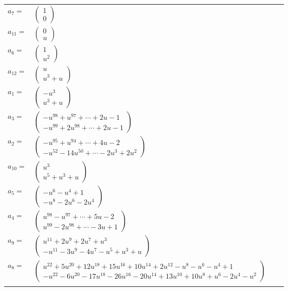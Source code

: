 \documentclass[1p]{elsarticle_modified}
\theoremstyle{definition}
\begin{document}
\begin{tabular}{m{7pt} m{180pt} m{7pt} m{180pt} }
\flushright $a_{7}=$&$\begin{pmatrix}1\\0\end{pmatrix}$ \\
\flushright $a_{11}=$&$\begin{pmatrix}0\\u\end{pmatrix}$ \\
\flushright $a_{6}=$&$\begin{pmatrix}1\\u^2\end{pmatrix}$ \\
\flushright $a_{12}=$&$\begin{pmatrix}u\\u^3+u\end{pmatrix}$ \\
\flushright $a_{1}=$&$\begin{pmatrix}- u^3\\u^3+u\end{pmatrix}$ \\
\flushright $a_{3}=$&$\begin{pmatrix}- u^{98}+u^{97}+\cdots+2 u-1\\- u^{99}+2 u^{98}+\cdots+2 u-1\end{pmatrix}$ \\
\flushright $a_{2}=$&$\begin{pmatrix}- u^{95}+u^{94}+\cdots+4 u-2\\- u^{52}-14 u^{50}+\cdots-2 u^3+2 u^2\end{pmatrix}$ \\
\flushright $a_{10}=$&$\begin{pmatrix}u^3\\u^5+u^3+u\end{pmatrix}$ \\
\flushright $a_{5}=$&$\begin{pmatrix}- u^6- u^4+1\\- u^8-2 u^6-2 u^4\end{pmatrix}$ \\
\flushright $a_{4}=$&$\begin{pmatrix}u^{98}- u^{97}+\cdots+5 u-2\\u^{99}-2 u^{98}+\cdots-3 u+1\end{pmatrix}$ \\
\flushright $a_{9}=$&$\begin{pmatrix}u^{11}+2 u^9+2 u^7+u^3\\- u^{11}-3 u^9-4 u^7- u^5+u^3+u\end{pmatrix}$ \\
\flushright $a_{8}=$&$\begin{pmatrix}u^{22}+5 u^{20}+12 u^{18}+15 u^{16}+10 u^{14}+2 u^{12}- u^8- u^6- u^4+1\\- u^{22}-6 u^{20}-17 u^{18}-26 u^{16}-20 u^{14}+13 u^{10}+10 u^8+u^6-2 u^4- u^2\end{pmatrix}$\\&\end{tabular}
\end{document}
